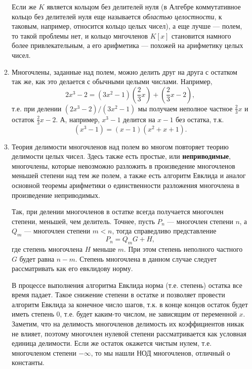 \begin{enumerate}
Если же $K$ является кольцом без делителей нуля (в Алгебре коммутативное кольцо без делителей нуля еще называется \textit{областью целостности}, к таковым, например, относится кольцо целых чисел), а еще лучше --- полем, то такой проблемы нет, и кольцо мнгочленов $K[x]$ становится намного более привлекательным, а его арифметика --- похожей на арифметику целых чисел.




\item Многочлены, заданные над полем, можно делить друг на друга с остатком так же, как это делается с обычными целыми числами. Например, 
$$
2x^3-2=(3x^2-1)\left(\frac23x\right) + \left(\frac23x-2\right),
$$
т.е. при делении $(2x^3-2)/(3x^2-1)$ мы получаем неполное частное $\frac23x$ и остаток $\frac23x-2$. А, например, $x^3-1$ делится на $x-1$ без остатка, т.к.
$$
(x^3-1)=(x-1)(x^2+x+1).
$$
\item Теория делимости многочленов над полем во многом повторяет теорию делимости целых чисел. Здесь также есть простые, или \textbf{неприводимые}, многочлены, которые невозможно разложить в произведение многочленов меньшей степени над тем же полем, а также есть алгоритм Евклида и аналог основной теоремы арифметики о единственности разложения многочлена в произведение неприводимых.

Так, при делении многочленов в остатке всегда получается многочлен степени, меньшей, чем делитель. Точнее, пусть $P_n$ --- многочлен степени $n$, а $Q_m$ --- многочлен степени $m<n$, тогда справедливо представление
$$
P_n = Q_m G+H,
$$
где степень многочлена $H$ меньше $m$. При этом степень неполного частного $G$ будет равна $n-m$. Степень многочлена в данном случае следует рассматривать как его евклидову норму.

В процессе выполнения алгоритма Евклида норма (т.е. степень) остатка все время падает.
Такое снижение степени в остатке и позволяет провести алгоритм Евклида за конечное число шагов, т.к. в конце концов остаток будет иметь степень 0, т.е. будет каким-то числом, не зависящим от переменной $x$. Заметим, что на делимость многочленов делимость их коэффициентов никак не влияет, поэтому многочлен нулевой степени рассматривается как условная единица делимости.
 Если же остаток окажется чистым нулем, т.е. многочленом степени $-\infty$, то мы нашли НОД многочленов, отличный о константы.
 

\end{enumerate}
